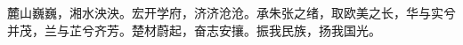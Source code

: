\begin{newThanks}
麓山巍巍，湘水泱泱。宏开学府，济济沧沧。承朱张之绪，取欧美之长，华与实兮并茂，兰与芷兮齐芳。楚材蔚起，奋志安攘。振我民族，扬我国光。
\end{newThanks}
